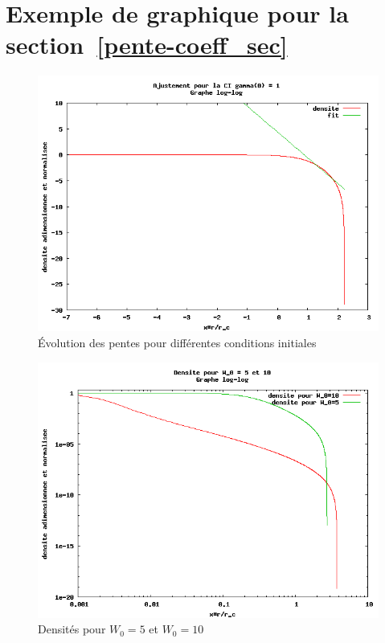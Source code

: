 \section{Exemple de graphique pour la section~\ref{pente-coeff_sec}}
	\begin{figure}[h]
		\centering \includegraphics[scale=0.40]{graphe/ci-pente_1.png}
		\caption{Évolution des pentes pour différentes conditions initiales}
		\label{ci-pente_1}
	\end{figure}

	\begin{figure}[h]
		\centering \includegraphics[scale=0.40]{graphe/w_0-5_10.png}
		\caption{Densités pour $W_0 = 5$ et $W_0 = 10$}
		\label{w_0-5_10}
	\end{figure}
	\FloatBarrier

